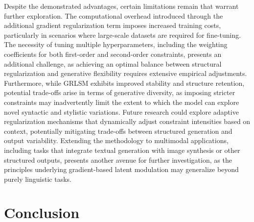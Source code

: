 \documentclass{article}
\begin{document}
Despite the demonstrated advantages, certain limitations remain that warrant further exploration. The computational overhead introduced through the additional gradient regularization term imposes increased training costs, particularly in scenarios where large-scale datasets are required for fine-tuning. The necessity of tuning multiple hyperparameters, including the weighting coefficients for both first-order and second-order constraints, presents an additional challenge, as achieving an optimal balance between structural regularization and generative flexibility requires extensive empirical adjustments. Furthermore, while GRLSM exhibits improved stability and structure retention, potential trade-offs arise in terms of generative diversity, as imposing stricter constraints may inadvertently limit the extent to which the model can explore novel syntactic and stylistic variations. Future research could explore adaptive regularization mechanisms that dynamically adjust constraint intensities based on context, potentially mitigating trade-offs between structured generation and output variability. Extending the methodology to multimodal applications, including tasks that integrate textual generation with image synthesis or other structured outputs, presents another avenue for further investigation, as the principles underlying gradient-based latent modulation may generalize beyond purely linguistic tasks.



\section{Conclusion}
\end{document}
